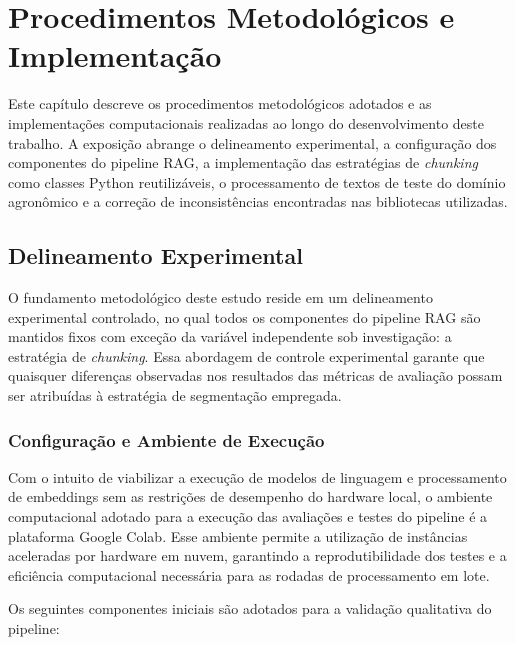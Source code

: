 \documentclass[
	12pt,				%
	openright,			%
	oneside,			%
	a4paper,			%
	tccpreliminar,		%
	]{ABNT-DC-UEL}
\begin{document}
\chapter{Procedimentos Metodológicos e Implementação}
\label{cap:metodologia}

Este capítulo descreve os procedimentos metodológicos adotados e as implementações computacionais realizadas ao longo do desenvolvimento deste trabalho. A exposição abrange o delineamento experimental, a configuração dos componentes do pipeline RAG, a implementação das estratégias de \textit{chunking} como classes Python reutilizáveis, o processamento de textos de teste do domínio agronômico e a correção de inconsistências encontradas nas bibliotecas utilizadas.


\section{Delineamento Experimental}

O fundamento metodológico deste estudo reside em um delineamento experimental controlado, no qual todos os componentes do pipeline RAG são mantidos fixos com exceção da variável independente sob investigação: a estratégia de \textit{chunking}. Essa abordagem de controle experimental garante que quaisquer diferenças observadas nos resultados das métricas de avaliação possam ser atribuídas à estratégia de segmentação empregada.

\subsection{Configuração e Ambiente de Execução}

Com o intuito de viabilizar a execução de modelos de linguagem e processamento de embeddings sem as restrições de desempenho do hardware local, o ambiente computacional adotado para a execução das avaliações e testes do pipeline é a plataforma Google Colab. Esse ambiente permite a utilização de instâncias aceleradas por hardware em nuvem, garantindo a reprodutibilidade dos testes e a eficiência computacional necessária para as rodadas de processamento em lote.

Os seguintes componentes iniciais são adotados para a validação qualitativa do pipeline:
\end{document}
